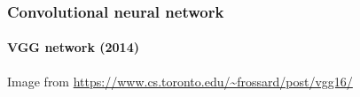 \documentclass[9pt]{beamer}
\begin{document}
\begin{frame}

  \frametitle{Convolutional neural network}
  
  \framesubtitle{VGG network (2014)}

  \begin{center}
  \end{center}

  {\small Image from \url{https://www.cs.toronto.edu/~frossard/post/vgg16/}}
\end{frame}
\end{document}

